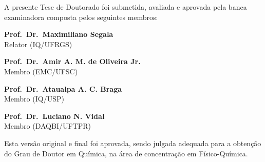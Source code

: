 %
% 
%
\begin{folhadeaprovacao}

	\begin{center}
		{\ABNTEXchapterfont\large\imprimirautor}

		\vspace*{\fill}\vspace*{\fill}
		\begin{center}
			\ABNTEXchapterfont\bfseries\Large\imprimirtitulo{}
		\end{center}
		\vspace*{\fill}

		\hspace{.45\textwidth}
		\begin{minipage}{.5\textwidth}
			\imprimirpreambulo{}
		\end{minipage}%
		\vspace*{\fill}
	\end{center}

	A presente Tese de Doutorado foi submetida,
	avaliada e aprovada
	pela banca examinadora composta pelos seguintes membros:

	\begin{center}
		\textbf{Prof.\ Dr.\ Maximiliano Segala} \\ Relator (IQ/UFRGS)

		\textbf{Prof.\ Dr.\ Amir A. M. de Oliveira Jr.} \\ Membro (EMC/UFSC)

		\textbf{Prof.\ Dr.\ Ataualpa A. C. Braga} \\ Membro (IQ/USP)

		\textbf{Prof.\ Dr.\ Luciano N. Vidal} \\ Membro (DAQBI/UFTPR)
	\end{center}

	Esta versão original e final foi aprovada,
	sendo julgada adequada para a obtenção do Grau de
	Doutor em Química, na área de concentração
	em Físico-Química.


	\begin{center}
		\vspace*{0.5cm}
		{\large\imprimirlocal}
		\par
		{\large\imprimirdata}
		\vspace*{0.5cm}
	\end{center}

\end{folhadeaprovacao}

